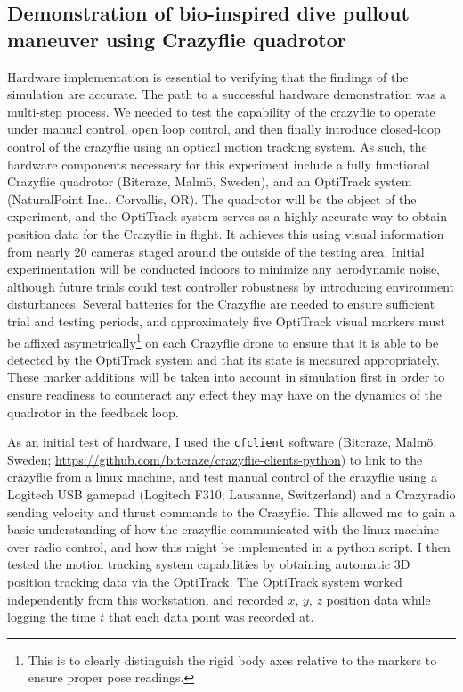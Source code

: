 \documentclass[onecolumn,10pt]{IEEEtran}
\begin{document}
\subsection{Demonstration of bio-inspired dive pullout maneuver using Crazyflie quadrotor}
	Hardware implementation is essential to verifying that the findings of the simulation are accurate. The path to a successful hardware demonstration was a multi-step process. We needed to test the capability of the crazyflie to operate under manual control, open loop control, and then finally introduce closed-loop control of the crazyflie using an optical motion tracking system. As such, the hardware components necessary for this experiment include a fully functional Crazyflie quadrotor (Bitcraze, Malm\"{o}, Sweden), and an OptiTrack system (NaturalPoint Inc., Corvallis, OR). The quadrotor will be the object of the experiment, and the OptiTrack system serves as a highly accurate way to obtain position data for the Crazyflie in flight. It achieves this using visual information from nearly 20 cameras staged around the outside of the testing area. Initial experimentation will be conducted indoors to minimize any aerodynamic noise, although future trials could test controller robustness by introducing environment disturbances. Several batteries for the Crazyflie are needed to ensure sufficient trial and testing periods, and approximately five OptiTrack visual markers must be affixed asymetrically\footnote{This is to clearly distinguish the rigid body axes relative to the markers to ensure proper pose readings.} on each Crazyflie drone to ensure that it is able to be detected by the OptiTrack system and that its state is measured appropriately. These marker additions will be taken into account in simulation first in order to ensure readiness to counteract any effect they may have on the dynamics of the quadrotor in the feedback loop.

As an initial test of hardware, I used the \lstinline{cfclient} software (Bitcraze, Malm\"{o}, Sweden; \url{https://github.com/bitcraze/crazyflie-clients-python}) to link to the crazyflie from a linux machine, and test manual control of the crazyflie using a Logitech USB gamepad (Logitech F310; Lausanne, Switzerland) and a Crazyradio sending velocity and thrust commands to the Crazyflie. This allowed me to gain a basic understanding of how the crazyflie communicated with the linux machine over radio control, and how this might be implemented in a python script. I then tested the motion tracking system capabilities by obtaining automatic 3D position tracking data via the OptiTrack. The OptiTrack system worked independently from this workstation, and recorded $x$, $y$, $z$ position data while logging the time $t$ that each data point was recorded at. 
\end{document}
